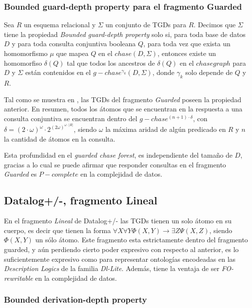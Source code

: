\documentclass[11pt,a4paper,twoside]{tesis}
\begin{document}
\subsubsection{Bounded guard-depth property para el fragmento Guarded}\label{guarded_forest_subsection}

Sea $R$ un esquema relacional y $\Sigma$ un conjunto de TGDs para $R$. Decimos que $\Sigma$ tiene la propiedad \textit{Bounded guard-depth property} solo si, para toda base de datos $D$ y para toda consulta conjuntiva booleana $Q$, para toda vez que exista un homomorfismo $\mu$ que mapea $Q$ en el $chase(D, \Sigma)$, entonces existe un homomorfiso $\delta(Q)$ tal que todos los ancestros de $\delta(Q)$ en el $chase graph$ para $D$ y $\Sigma$ están contenidos en el $g-chase^{\gamma_k}(D, \Sigma)$, donde $\gamma_k$ solo depende de $Q$ y $R$.

Tal como se muestra en \cite{JWS}, las TGDs del fragmento \textit{Guarded} poseen la propiedad anterior. En resumen, todos los átomos que se encuentran en la respuesta a una consulta conjuntiva se encuentran dentro del $g-chase^{(n + 1)\cdot\delta}$, con $\delta = (2\cdot\omega)^\omega\cdot2^{(2\omega)^{\omega\cdot|R|}}$, siendo $\omega$ la máxima aridad de algún predicado en $R$ y $n$ la cantidad de átomos en la consulta.

Esta profundidad en el \textit{guarded chase forest}, es independiente del tamaño de $D$, gracias a lo cual se puede afirmar que responder consultas en el fragmento \textit{Guarded} es $P-complete$ en la complejidad de datos.

\subsection{Datalog+/-, fragmento Lineal}

En el fragmento \textit{Lineal} de Datalog+/- las TGDs tienen un solo átomo en su cuerpo, es decir que tienen la forma $\forall X \forall  Y \Phi(X, Y) \rightarrow \exists Z \Psi(X,Z)$, siendo $\Phi(X,Y)$ un sólo átomo. Este fragmento esta estrictamente dentro del fragmento guarded, y aún perdiendo cierto poder expresivo con respecto al anterior, es lo suficientemente expresivo como para representar ontologías encodeadas en las \textit{Description Logics} de la familia \textit{Dl-Lite}. Además, tiene la ventaja de ser \textit{FO-rewritable} en la complejidad de datos.

\subsubsection{Bounded derivation-depth property}
\end{document}
